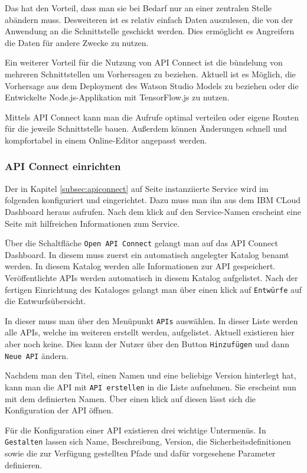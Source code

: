 Das hat den Vorteil, dass man sie bei Bedarf nur an einer zentralen Stelle abändern muss. Desweiteren ist es relativ
einfach Daten auszulesen, die von der Anwendung an die Schnittstelle geschickt werden. Dies ermöglicht es Angreifern die
Daten für andere Zwecke zu nutzen.

Ein weiterer Vorteil für die Nutzung von API Connect ist die bündelung von mehreren Schnittstellen um Vorhersagen zu
beziehen. Aktuell ist es Möglich, die Vorhersage aus dem Deployment des Watson Studio Models zu beziehen oder die
Entwickelte Node.js-Applikation mit TensorFlow.js zu nutzen.

Mittels API Connect kann man die Aufrufe optimal verteilen oder eigene Routen für die jeweile Schnittstelle bauen.
Außerdem können Änderungen schnell und kompfortabel in einem Online-Editor angepasst werden.

\subsubsection{API Connect einrichten}
Der in Kapitel \ref{subsec:apiconnect} auf Seite \pageref{subsec:apiconnect} instanziierte Service wird im folgenden
konfiguriert und eingerichtet. Dazu muss man ihn aus dem IBM CLoud Dashboard heraus aufrufen. Nach dem klick auf den
Service-Namen erscheint eine Seite mit hilfreichen Informationen zum Service.

Über die Schaltfläche \texttt{Open API Connect} gelangt man auf das API Connect Dashboard. In diesem muss zuerst ein
automatisch angelegter Katalog benamt werden. In diesem Katalog werden alle Informationen zur API gespeichert.
Veröffentlichte APIs werden automatisch in diesem Katalog aufgelistet. Nach der fertigen Einrichtung des Kataloges gelangt
man über einen klick auf \texttt{Entwürfe} auf die Entwurfsübersicht.

In dieser muss man über den Menüpunkt \texttt{APIs} auswählen. In dieser Liste werden alle APIs, welche im weiteren
erstellt werden, aufgelistet. Aktuell existieren hier aber noch keine. Dies kann der Nutzer über den Button
\texttt{Hinzufügen} und dann \texttt{Neue API} ändern.

Nachdem man den Titel, einen Namen und eine beliebige Version hinterlegt hat, kann man die API mit \texttt{API erstellen}
in die Liste aufnehmen. Sie erscheint nun mit dem definierten Namen. Über einen klick auf diesen lässt sich die
Konfiguration der API öffnen.

Für die Konfiguration einer API existieren drei wichtige Untermenüs. In \texttt{Gestalten} lassen sich Name, Beschreibung,
Version, die Sicherheitsdefinitionen sowie die zur Verfügung gestellten Pfade und dafür vorgesehene Parameter definieren.

